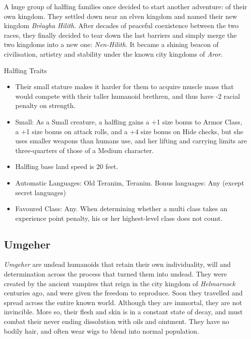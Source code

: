 A huge group of halfling families once decided to start another adventure: of
their own kingdom. They settled down near an elven kingdom and named their new
kingdom \emph{Brèagha Hilith}. After decades of peaceful coexistence between
the two races, they finally decided to tear down the last barriers and simply
merge the two kingdoms into a new one: \emph{Nen-Hilith}. It became a shining
beacon of civilisation, artistry and stability under the known city kingdoms
of \emph{Aror}.


\begin{35e}{Halfling Traits}
  \begin{itemize}[noitemsep]
    \item Their small stature makes it harder for them to acquire muscle mass
      that would compete with their taller humanoid brethren, and thus have
      -2 racial penalty on strength.
    \item Small: As a Small creature, a halfling gains a +1 size bonus to
    Armor Class, a +1 size bonus on attack rolls, and a +4 size bonus on Hide
    checks, but she uses smaller weapons than humans use, and her lifting and
    carrying limits are three-quarters of those of a Medium character.
    \item Halfling base land speed is 20 feet.
    \item Automatic Languages: Old Teranim, Teranim. Bonus languages: Any
    (except secret languages)
    \item Favoured Class: Any. When determining whether a multi class takes an
          experience point penalty, his or her highest-level class does not
          count.
  \end{itemize}
\end{35e}

\subsection{Umgeher}
\label{sec:Umgeher}



\emph{Umgeher} are undead humanoids that retain their own individuality,
will and determination across the process that turned them into undead. They
were created by the ancient vampires that reign in the city kingdom of
\emph{Helmarnock} centuries ago, and were given the freedom to reproduce.
Soon they travelled and spread across the entire known world. Although they
are immortal, they are not invincible. More so, their flesh and skin is in a
constant state of decay, and must combat their never ending dissolution with
oils and ointment. They have no bodily hair, and often wear wigs to blend into
normal population.

